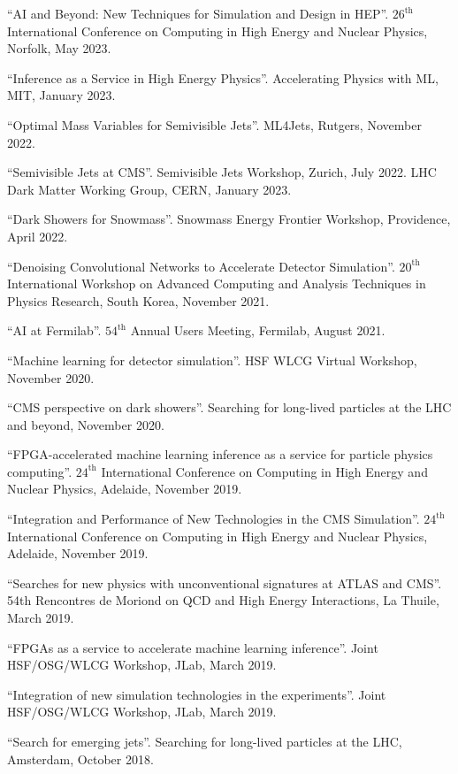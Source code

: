 \begin{nbdescription}[leftmargin=12pt,font=\normalfont,labelsep=0em]
\item ``AI and Beyond: New Techniques for Simulation and Design in HEP''. $26^{\text{th}}$ International Conference on Computing in High Energy and Nuclear Physics, Norfolk, May 2023.
\item ``Inference as a Service in High Energy Physics''. Accelerating Physics with ML, MIT, January 2023.
\item ``Optimal Mass Variables for Semivisible Jets''. ML4Jets, Rutgers, November 2022.
\item ``Semivisible Jets at CMS''. Semivisible Jets Workshop, Zurich, July 2022. LHC Dark Matter Working Group, CERN, January 2023.
\item ``Dark Showers for Snowmass''. Snowmass Energy Frontier Workshop, Providence, April 2022.
\item ``Denoising Convolutional Networks to Accelerate Detector Simulation''. $20^{\text{th}}$ International Workshop on Advanced Computing and Analysis Techniques in Physics Research, South Korea, November 2021.
\item ``AI at Fermilab''. $54^{\text{th}}$ Annual Users Meeting, Fermilab, August 2021.
\item ``Machine learning for detector simulation''. HSF WLCG Virtual Workshop, November 2020.
\item ``CMS perspective on dark showers''. Searching for long-lived particles at the LHC and beyond, November 2020.
\item ``FPGA-accelerated machine learning inference as a service for particle physics computing''. $24^{\text{th}}$ International Conference on Computing in High Energy and Nuclear Physics, Adelaide, November 2019.
\item ``Integration and Performance of New Technologies in the CMS Simulation''. $24^{\text{th}}$ International Conference on Computing in High Energy and Nuclear Physics, Adelaide, November 2019.
\item ``Searches for new physics with unconventional signatures at ATLAS and CMS''. 54th Rencontres de Moriond on QCD and High Energy Interactions, La Thuile, March 2019.
\item ``FPGAs as a service to accelerate machine learning inference''. Joint HSF/OSG/WLCG Workshop, JLab, March 2019.
\item ``Integration of new simulation technologies in the experiments''. Joint HSF/OSG/WLCG Workshop, JLab, March 2019.
\item ``Search for emerging jets''. Searching for long-lived particles at the LHC, Amsterdam, October 2018.

\end{nbdescription}
